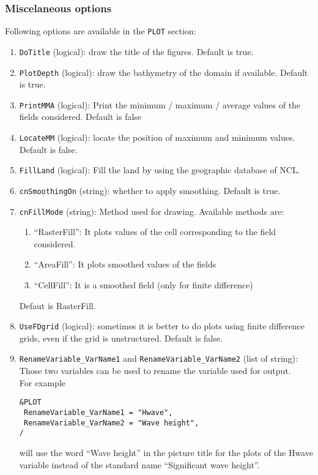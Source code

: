 \documentclass[12pt]{amsart}
\begin{document}
\subsubsection{Miscelaneous options}

Following options are available in the {\tt PLOT} section:
\begin{enumerate}
\item {\tt DoTitle} (logical): draw the title of the figures. Default is true.
\item {\tt PlotDepth} (logical): draw the bathymetry of the domain if available. Default is true.
\item {\tt PrintMMA} (logical): Print the minimum / maximum / average values of the fields considered. Default is false
\item {\tt LocateMM} (logical): locate the position of maximum and minimum values. Default is false.
\item {\tt FillLand} (logical): Fill the land by using the geographic database of NCL.
\item {\tt cnSmoothingOn} (string): whether to apply smoothing. Default is true.
\item {\tt cnFillMode} (string): Method used for drawing. Available methods are:
  \begin{enumerate}
  \item ``RasterFill'': It plots values of the cell corresponding to the field considered.
  \item ``AreaFill'': It plots smoothed values of the fields
  \item ``CellFill'': It is a smoothed field (only for finite difference)
  \end{enumerate}
  Defaut is RasterFill.
\item {\tt UseFDgrid} (logical): sometimes it is better to do plots
using finite difference grids, even if the grid is unstructured. Default is false.
\item {\tt RenameVariable\_VarName1} and {\tt RenameVariable\_VarName2} (list of string): Those two variables can be used to rename the variable used for output.\\
  For example
\begin{verbatim}
&PLOT
 RenameVariable_VarName1 = "Hwave", 
 RenameVariable_VarName2 = "Wave height", 
/
\end{verbatim}
will use the word ``Wave height'' in the picture title for the plots of the Hwave variable instead of the standard name ``Significant wave height''.
  
\end{enumerate}
\end{document}
